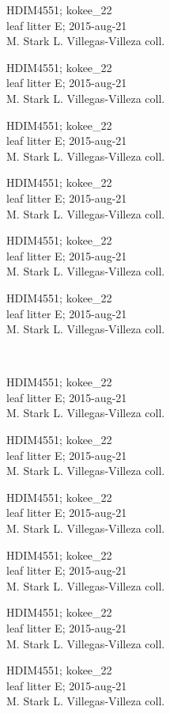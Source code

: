 \documentclass[2pt]{extarticle}
\begin{document}
\noindent
\parbox{0.16\textwidth}{\tiny \raggedright \rule[-0.3\baselineskip]{0pt}{10pt}HDIM4551; kokee\_22\\ leaf litter E; 2015-aug-21\\ M. Stark L. Villegas-Villeza coll.}
\parbox{0.16\textwidth}{\tiny \raggedright \rule[-0.3\baselineskip]{0pt}{10pt}HDIM4551; kokee\_22\\ leaf litter E; 2015-aug-21\\ M. Stark L. Villegas-Villeza coll.}
\parbox{0.16\textwidth}{\tiny \raggedright \rule[-0.3\baselineskip]{0pt}{10pt}HDIM4551; kokee\_22\\ leaf litter E; 2015-aug-21\\ M. Stark L. Villegas-Villeza coll.}
\parbox{0.16\textwidth}{\tiny \raggedright \rule[-0.3\baselineskip]{0pt}{10pt}HDIM4551; kokee\_22\\ leaf litter E; 2015-aug-21\\ M. Stark L. Villegas-Villeza coll.}
\parbox{0.16\textwidth}{\tiny \raggedright \rule[-0.3\baselineskip]{0pt}{10pt}HDIM4551; kokee\_22\\ leaf litter E; 2015-aug-21\\ M. Stark L. Villegas-Villeza coll.}
\parbox{0.16\textwidth}{\tiny \raggedright \rule[-0.3\baselineskip]{0pt}{10pt}HDIM4551; kokee\_22\\ leaf litter E; 2015-aug-21\\ M. Stark L. Villegas-Villeza coll.} \\ 
\vspace{0.001in} 

\noindent
\parbox{0.16\textwidth}{\tiny \raggedright \rule[-0.3\baselineskip]{0pt}{10pt}HDIM4551; kokee\_22\\ leaf litter E; 2015-aug-21\\ M. Stark L. Villegas-Villeza coll.}
\parbox{0.16\textwidth}{\tiny \raggedright \rule[-0.3\baselineskip]{0pt}{10pt}HDIM4551; kokee\_22\\ leaf litter E; 2015-aug-21\\ M. Stark L. Villegas-Villeza coll.}
\parbox{0.16\textwidth}{\tiny \raggedright \rule[-0.3\baselineskip]{0pt}{10pt}HDIM4551; kokee\_22\\ leaf litter E; 2015-aug-21\\ M. Stark L. Villegas-Villeza coll.}
\parbox{0.16\textwidth}{\tiny \raggedright \rule[-0.3\baselineskip]{0pt}{10pt}HDIM4551; kokee\_22\\ leaf litter E; 2015-aug-21\\ M. Stark L. Villegas-Villeza coll.}
\parbox{0.16\textwidth}{\tiny \raggedright \rule[-0.3\baselineskip]{0pt}{10pt}HDIM4551; kokee\_22\\ leaf litter E; 2015-aug-21\\ M. Stark L. Villegas-Villeza coll.}
\parbox{0.16\textwidth}{\tiny \raggedright \rule[-0.3\baselineskip]{0pt}{10pt}HDIM4551; kokee\_22\\ leaf litter E; 2015-aug-21\\ M. Stark L. Villegas-Villeza coll.} \\ 
\vspace{0.001in} 
\end{document}
